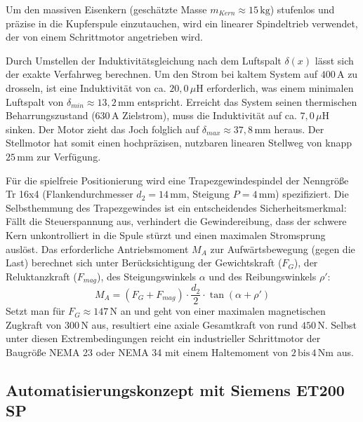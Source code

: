 Um den massiven Eisenkern (geschätzte Masse $m_{Kern} \approx 15\,\text{kg}$) stufenlos und präzise in die Kupferspule einzutauchen, wird ein linearer Spindeltrieb verwendet, der von einem Schrittmotor angetrieben wird. 

Durch Umstellen der Induktivitätsgleichung nach dem Luftspalt $\delta(x)$ lässt sich der exakte Verfahrweg berechnen. Um den Strom bei kaltem System auf $400\,\text{A}$ zu drosseln, ist eine Induktivität von ca. $20,0\,\mu\text{H}$ erforderlich, was einem minimalen Luftspalt von $\delta_{min} \approx 13,2\,\text{mm}$ entspricht. Erreicht das System seinen thermischen Beharrungszustand (630\,A Zielstrom), muss die Induktivität auf ca. $7,0\,\mu\text{H}$ sinken. Der Motor zieht das Joch folglich auf $\delta_{max} \approx 37,8\,\text{mm}$ heraus. Der Stellmotor hat somit einen hochpräzisen, nutzbaren linearen Stellweg von knapp $25\,\text{mm}$ zur Verfügung.

Für die spielfreie Positionierung wird eine Trapezgewindespindel der Nenngröße Tr 16x4 (Flankendurchmesser $d_2 = 14\,\text{mm}$, Steigung $P = 4\,\text{mm}$) spezifiziert. Die Selbsthemmung des Trapezgewindes ist ein entscheidendes Sicherheitsmerkmal: Fällt die Steuerspannung aus, verhindert die Gewindereibung, dass der schwere Kern unkontrolliert in die Spule stürzt und einen maximalen Stromsprung auslöst.
Das erforderliche Antriebsmoment $M_A$ zur Aufwärtsbewegung (gegen die Last) berechnet sich unter Berücksichtigung der Gewichtskraft ($F_G$), der Reluktanzkraft ($F_{mag}$), des Steigungswinkels $\alpha$ und des Reibungswinkels $\rho'$:
\begin{equation}
    M_A = (F_G + F_{mag}) \cdot \frac{d_2}{2} \cdot \tan(\alpha + \rho')
\end{equation}
Setzt man für $F_G \approx 147\,\text{N}$ an und geht von einer maximalen magnetischen Zugkraft von $300\,\text{N}$ aus, resultiert eine axiale Gesamtkraft von rund $450\,\text{N}$. Selbst unter diesen Extrembedingungen reicht ein industrieller Schrittmotor der Baugröße NEMA 23 oder NEMA 34 mit einem Haltemoment von $2\,\text{bis}\,4\,\text{Nm}$ aus.

\subsection{Automatisierungskonzept mit Siemens ET200 SP}
\label{sec:automatisierung_et200sp}

